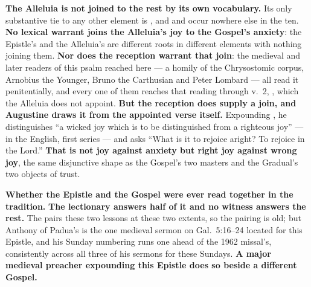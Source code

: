 \textbf{The Alleluia is not joined to the rest by its own vocabulary.} Its only
substantive tie to any other element is , and 
and  occur nowhere else in the ten. \textbf{No lexical warrant
joins the Alleluia's joy to the Gospel's anxiety}:
the Epistle's  and the Alleluia's  are
different roots in different elements with nothing joining them. \textbf{Nor
does the reception warrant that join}: the medieval and later readers of this
psalm reached here --- a homily of the Chrysostomic corpus, Arnobius the
Younger, Bruno the Carthusian and Peter Lombard --- all read it penitentially,
and every one of them reaches that reading through v.~2,
, which the Alleluia does not
appoint. \textbf{But the reception does supply a join, and Augustine draws it
from the appointed verse itself.} Expounding , he distinguishes
``a wicked joy which is to be distinguished from a righteous joy'' --- in the
 English, first series --- and asks
``What is it to rejoice aright? To rejoice in the Lord.''
\textbf{That is not joy against anxiety but right joy against wrong joy}, the
same disjunctive shape as the Gospel's two masters and the Gradual's two objects
of trust.

\textbf{Whether the Epistle and the Gospel were ever read together in the
tradition.} \textbf{The lectionary answers half of it and no witness answers the
rest.} The  pairs these two lessons at these two extents, so
the pairing is old; but Anthony of Padua's is the one medieval sermon on
Gal.\ 5:16--24 located for this Epistle, and his Sunday numbering runs one
ahead of the 1962 missal's, consistently across all three of his sermons for
these Sundays.
\textbf{A major medieval preacher expounding this Epistle does so beside a
different Gospel.}

\clearpage

